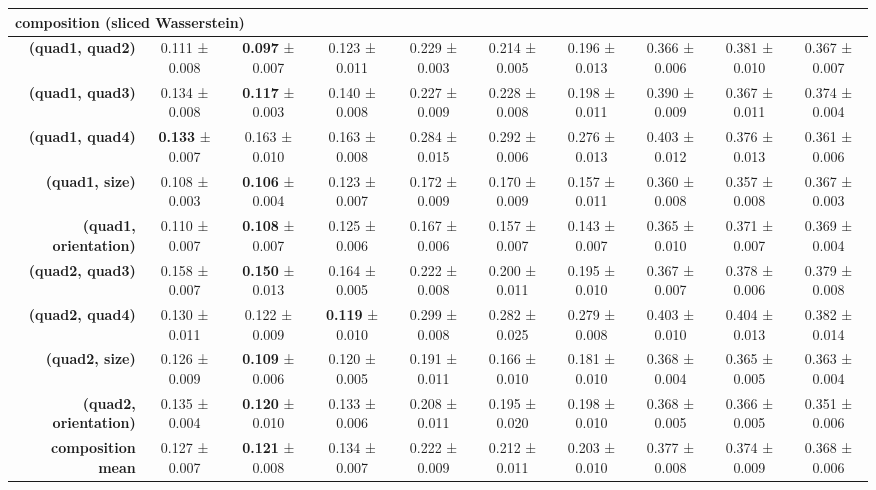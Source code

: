 \begin{tabular}{rccccccccc}
\midrule
\multicolumn{ 10 }{l}{\textbf{composition}  (sliced Wasserstein)} \\
\midrule
\textbf{(quad1, quad2)} & 0.111 ± 0.008 & \textbf{0.097} ± 0.007 & 0.123 ± 0.011 & 0.229 ± 0.003 & 0.214 ± 0.005 & 0.196 ± 0.013 & 0.366 ± 0.006 & 0.381 ± 0.010 & 0.367 ± 0.007 \\
\textbf{(quad1, quad3)} & 0.134 ± 0.008 & \textbf{0.117} ± 0.003 & 0.140 ± 0.008 & 0.227 ± 0.009 & 0.228 ± 0.008 & 0.198 ± 0.011 & 0.390 ± 0.009 & 0.367 ± 0.011 & 0.374 ± 0.004 \\
\textbf{(quad1, quad4)} & \textbf{0.133} ± 0.007 & 0.163 ± 0.010 & 0.163 ± 0.008 & 0.284 ± 0.015 & 0.292 ± 0.006 & 0.276 ± 0.013 & 0.403 ± 0.012 & 0.376 ± 0.013 & 0.361 ± 0.006 \\
\textbf{(quad1, size)} & 0.108 ± 0.003 & \textbf{0.106} ± 0.004 & 0.123 ± 0.007 & 0.172 ± 0.009 & 0.170 ± 0.009 & 0.157 ± 0.011 & 0.360 ± 0.008 & 0.357 ± 0.008 & 0.367 ± 0.003 \\
\textbf{(quad1, orientation)} & 0.110 ± 0.007 & \textbf{0.108} ± 0.007 & 0.125 ± 0.006 & 0.167 ± 0.006 & 0.157 ± 0.007 & 0.143 ± 0.007 & 0.365 ± 0.010 & 0.371 ± 0.007 & 0.369 ± 0.004 \\
\textbf{(quad2, quad3)} & 0.158 ± 0.007 & \textbf{0.150} ± 0.013 & 0.164 ± 0.005 & 0.222 ± 0.008 & 0.200 ± 0.011 & 0.195 ± 0.010 & 0.367 ± 0.007 & 0.378 ± 0.006 & 0.379 ± 0.008 \\
\textbf{(quad2, quad4)} & 0.130 ± 0.011 & 0.122 ± 0.009 & \textbf{0.119} ± 0.010 & 0.299 ± 0.008 & 0.282 ± 0.025 & 0.279 ± 0.008 & 0.403 ± 0.010 & 0.404 ± 0.013 & 0.382 ± 0.014 \\
\textbf{(quad2, size)} & 0.126 ± 0.009 & \textbf{0.109} ± 0.006 & 0.120 ± 0.005 & 0.191 ± 0.011 & 0.166 ± 0.010 & 0.181 ± 0.010 & 0.368 ± 0.004 & 0.365 ± 0.005 & 0.363 ± 0.004 \\
\textbf{(quad2, orientation)} & 0.135 ± 0.004 & \textbf{0.120} ± 0.010 & 0.133 ± 0.006 & 0.208 ± 0.011 & 0.195 ± 0.020 & 0.198 ± 0.010 & 0.368 ± 0.005 & 0.366 ± 0.005 & 0.351 ± 0.006 \\
\addlinespace
\textbf{composition mean} & 0.127 ± 0.007 & \textbf{0.121} ± 0.008 & 0.134 ± 0.007 & 0.222 ± 0.009 & 0.212 ± 0.011 & 0.203 ± 0.010 & 0.377 ± 0.008 & 0.374 ± 0.009 & 0.368 ± 0.006 \\
\midrule
\bottomrule
\end{tabular}
